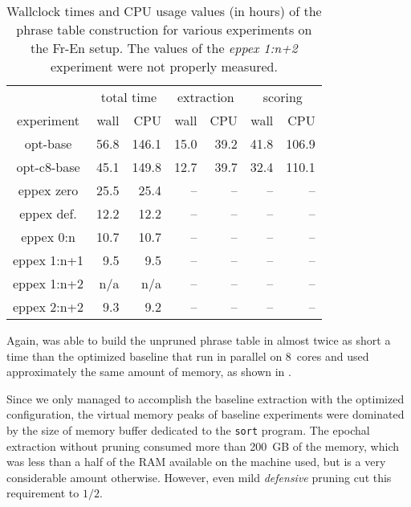 \begin{table}[ht]
\centering
\begin{tabular}{ | c | r r | r r | r r | }
\hline
 & \multicolumn{2}{|c|}{total time} & \multicolumn{2}{|c|}{extraction} & \multicolumn{2}{|c|}{scoring} \\
experiment & wall & CPU & wall & CPU & wall & CPU \\
\hline
\hline
opt-base      & 56.8 & 146.1 & 15.0 & 39.2 & 41.8 & 106.9 \\
opt-c8-base   & 45.1 & 149.8 & 12.7 & 39.7 & 32.4 & 110.1 \\
eppex zero    & 25.5 &  25.4 & -- & -- & -- & -- \\
\hline
eppex def.    & 12.2 & 12.2 & -- & -- & -- & -- \\
eppex 0:n     & 10.7 & 10.7 & -- & -- & -- & -- \\
eppex 1:n+1   & 9.5 & 9.5 & -- & -- & -- & -- \\
eppex 1:n+2   & n/a & n/a & -- & -- & -- & -- \\
eppex 2:n+2   & 9.3 & 9.2 & -- & -- & -- & -- \\
\hline
\end{tabular}
\caption{\label{fr-en-time-benchmarks}
Wallclock times and CPU usage values (in hours) of the phrase table
construction for various experiments on the Fr-En setup.
The values of the \emph{eppex 1:n+2} experiment were not properly measured.}
\end{table}

Again, \eppex{} was able to build the unpruned phrase table in almost twice
as short a time than the optimized baseline that run in parallel on 8~cores
and used approximately the same amount of memory, as shown in .

Since we only managed to accomplish the baseline extraction with the optimized
configuration, the virtual memory peaks of baseline experiments were dominated by
the size of memory buffer dedicated to the \texttt{sort} program.
The epochal extraction without pruning consumed more than 200~GB of the memory,
which was less than a half of the RAM available on the machine used,
but is a very considerable amount otherwise.
However, even mild \emph{defensive} pruning cut this requirement to $1/2$.

